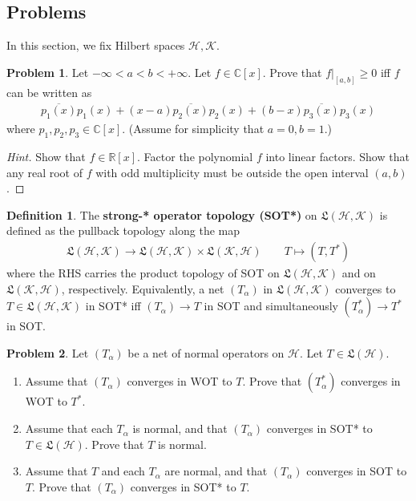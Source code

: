 \documentclass[12pt,b5paper,notitlepage]{article}
\theoremstyle{definition}
\newtheorem{df}{Definition}[subsection]
\newtheorem{prob}{\color{red}Problem}[section]
\theoremstyle{plain}
\newcommand{\fk}{\mathfrak}
\newcommand{\ovl}{\overline}
\newcommand{\Cbb}{\mathbb C}
\newcommand{\Rbb}{\mathbb R}
\newcommand{\MH}{\mathcal H}
\newcommand{\MK}{\mathcal K}
\numberwithin{equation}{section}
\begin{document}
\subsection{Problems}

In this section, we fix Hilbert spaces $\MH,\MK$.

\begin{prob}\label{lb284}
Let $-\infty<a<b<+\infty$. Let $f\in\Cbb[x]$. Prove that $f|_{[a,b]}\geq0$ iff $f$ can be written as
\begin{align*}
\ovl{p_1(x)}p_1(x)+(x-a)\ovl{p_2(x)}p_2(x)+(b-x)\ovl{p_3(x)}p_3(x)
\end{align*}
where $p_1,p_2,p_3\in\Cbb[x]$. (Assume for simplicity that $a=0,b=1$.)
\end{prob}

\begin{proof}[Hint]
Show that $f\in\Rbb[x]$. Factor the polynomial $f$ into linear factors. Show that any real root of $f$ with odd multiplicity must be outside the open interval $(a,b)$.
\end{proof}






\begin{df}
The \textbf{strong-* operator topology (SOT*)}   on $\fk L(\MH,\MK)$ is defined as the pullback topology along the map
\begin{align*}
\fk L(\MH,\MK)\rightarrow\fk L(\MH,\MK)\times\fk L(\MK,\MH)\qquad T\mapsto (T,T^*)
\end{align*}
where the RHS carries the product topology of SOT on $\fk L(\MH,\MK)$ and on $\fk L(\MK,\MH)$, respectively. Equivalently, a net $(T_\alpha)$ in $\fk L(\MH,\MK)$ converges to $T\in\fk L(\MH,\MK)$ in SOT* iff $(T_\alpha)\rightarrow T$ in SOT and simultaneously $(T_\alpha^*)\rightarrow T^*$ in SOT.
\end{df}




\begin{prob}\label{lb337}
Let $(T_\alpha)$ be a net of normal operators on $\MH$. Let $T\in\fk L(\MH)$. 
\begin{enumerate}
\item Assume that $(T_\alpha)$ converges in WOT to $T$. Prove that $(T_\alpha^*)$ converges in WOT to $T^*$.
\item Assume that each $T_\alpha$ is normal, and that $(T_\alpha)$ converges in SOT* to $T\in\fk L(\MH)$. Prove that $T$ is normal.
\item Assume that $T$ and each $T_\alpha$ are normal, and that $(T_\alpha)$ converges in SOT to $T$. Prove that $(T_\alpha)$ converges in SOT* to $T$.
\end{enumerate}
\end{prob}
\end{document}
